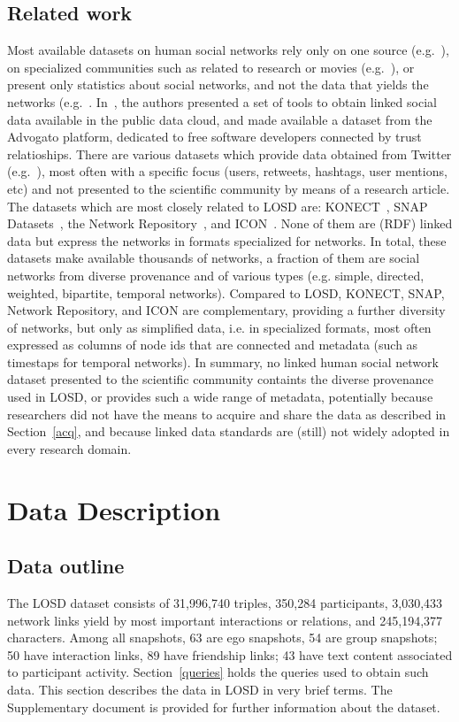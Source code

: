 \documentclass[data,datadescriptor,submit,moreauthors,pdftex]{Definitions/mdpi}
\begin{document}
\subsection{Related work}\label{srel}
Most available datasets on human social networks rely only on one source (e.g.~\cite{nat,fb1}),
on specialized communities such as related to research or movies (e.g.~\cite{s1}),
or present only statistics about social networks, and not the data that yields the networks (e.g.~\cite{st1}.
In~\cite{foaf1}, the authors presented a set of tools to obtain linked social data available in the public data cloud,
and made available a dataset from the Advogato platform,
dedicated to free software developers connected by trust relatioships.
There are various datasets which provide data obtained from Twitter (e.g.~\cite{tw1,tw2}),
most often with a specific focus (users, retweets, hashtags, user mentions, etc)
and not presented to the scientific community by means of a research article.
The datasets which are most closely related to LOSD are: KONECT~\cite{konect},
SNAP Datasets~\cite{snapnets}, the Network Repository~\cite{nr}, and ICON~\cite{icon}.
None of them are (RDF) linked data but express the networks in formats specialized for networks.
In total, these datasets make available thousands of networks,
a fraction of them are social networks from diverse provenance and
of various types (e.g. simple, directed, weighted, bipartite, temporal networks).
Compared to LOSD, KONECT, SNAP, Network Repository, and ICON are complementary, providing a further diversity of networks,
but only as simplified data, i.e. in specialized formats, most often expressed as columns of node ids
that are connected and metadata (such as timestaps for temporal networks).
In summary, no linked human social network dataset presented to the
scientific community containts the diverse provenance used in LOSD,
or provides such a wide range of metadata,
potentially because researchers did not have the means to acquire and
share the data as described in Section~\ref{acq},
and because linked data standards are (still) not widely adopted in 
every research domain.

\section{Data Description}\label{materials}
\subsection{Data outline}\label{outline}
The LOSD dataset consists of 31,996,740 triples, 350,284 participants,
3,030,433 network links yield by most important interactions or relations, and 245,194,377 characters.
Among all snapshots, 63 are ego snapshots, 54 are group snapshots; 50 have interaction links,
89 have friendship links; 43 have text content associated to participant activity.
Section~\ref{queries} holds the queries used to obtain such data.
This section describes the data in LOSD in very brief terms.
The Supplementary document is provided for further information about the dataset.
\end{document}
